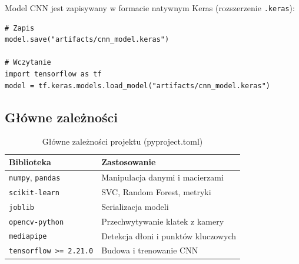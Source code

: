 Model CNN jest zapisywany w formacie natywnym Keras (rozszerzenie \texttt{.keras}):

\begin{lstlisting}[style=stylePython, caption={Zapis i odczyt modelu CNN (Keras)}, label=lst:keras]
# Zapis
model.save("artifacts/cnn_model.keras")

# Wczytanie
import tensorflow as tf
model = tf.keras.models.load_model("artifacts/cnn_model.keras")
\end{lstlisting}

\subsection{Główne zależności}

\begin{table}[H]
    \centering
    \caption{Główne zależności projektu (pyproject.toml)}
    \label{tab:deps}
    \begin{tabular}{ll}
        \toprule
        \textbf{Biblioteka} & \textbf{Zastosowanie} \\
        \midrule
        \texttt{numpy}, \texttt{pandas}   & Manipulacja danymi i macierzami \\
        \texttt{scikit-learn}             & SVC, Random Forest, metryki \\
        \texttt{joblib}                   & Serializacja modeli \\
        \texttt{opencv-python}            & Przechwytywanie klatek z kamery \\
        \texttt{mediapipe}                & Detekcja dłoni i punktów kluczowych \\
        \texttt{tensorflow >= 2.21.0}     & Budowa i trenowanie CNN \\
        \bottomrule
    \end{tabular}
\end{table}

